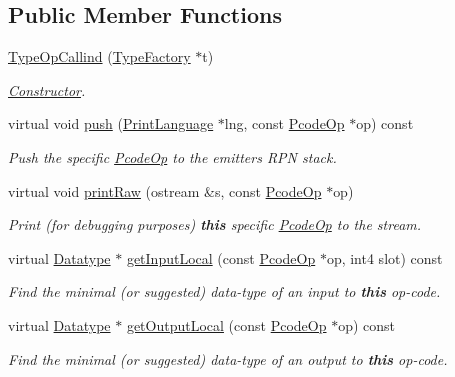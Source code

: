 \subsection*{Public Member Functions}
\begin{DoxyCompactItemize}
\item 
\mbox{\hyperlink{class_type_op_callind_a52c835a09232ea02c87846f8684841ac}{Type\+Op\+Callind}} (\mbox{\hyperlink{class_type_factory}{Type\+Factory}} $\ast$t)
\begin{DoxyCompactList}\small\item\em \mbox{\hyperlink{class_constructor}{Constructor}}. \end{DoxyCompactList}\item 
virtual void \mbox{\hyperlink{class_type_op_callind_adcb3858720f0774e85cb5e2e7ced8abd}{push}} (\mbox{\hyperlink{class_print_language}{Print\+Language}} $\ast$lng, const \mbox{\hyperlink{class_pcode_op}{Pcode\+Op}} $\ast$op) const
\begin{DoxyCompactList}\small\item\em Push the specific \mbox{\hyperlink{class_pcode_op}{Pcode\+Op}} to the emitter\textquotesingle{}s R\+PN stack. \end{DoxyCompactList}\item 
virtual void \mbox{\hyperlink{class_type_op_callind_afab872c8d49a043fb21a0a10ace10507}{print\+Raw}} (ostream \&s, const \mbox{\hyperlink{class_pcode_op}{Pcode\+Op}} $\ast$op)
\begin{DoxyCompactList}\small\item\em Print (for debugging purposes) {\bfseries{this}} specific \mbox{\hyperlink{class_pcode_op}{Pcode\+Op}} to the stream. \end{DoxyCompactList}\item 
virtual \mbox{\hyperlink{class_datatype}{Datatype}} $\ast$ \mbox{\hyperlink{class_type_op_callind_a12ae23733dbb5b171ab30f32a90b973c}{get\+Input\+Local}} (const \mbox{\hyperlink{class_pcode_op}{Pcode\+Op}} $\ast$op, int4 slot) const
\begin{DoxyCompactList}\small\item\em Find the minimal (or suggested) data-\/type of an input to {\bfseries{this}} op-\/code. \end{DoxyCompactList}\item 
virtual \mbox{\hyperlink{class_datatype}{Datatype}} $\ast$ \mbox{\hyperlink{class_type_op_callind_a41272ab087f4aacf6c3434911bbc055e}{get\+Output\+Local}} (const \mbox{\hyperlink{class_pcode_op}{Pcode\+Op}} $\ast$op) const
\begin{DoxyCompactList}\small\item\em Find the minimal (or suggested) data-\/type of an output to {\bfseries{this}} op-\/code. \end{DoxyCompactList}\end{DoxyCompactItemize}
